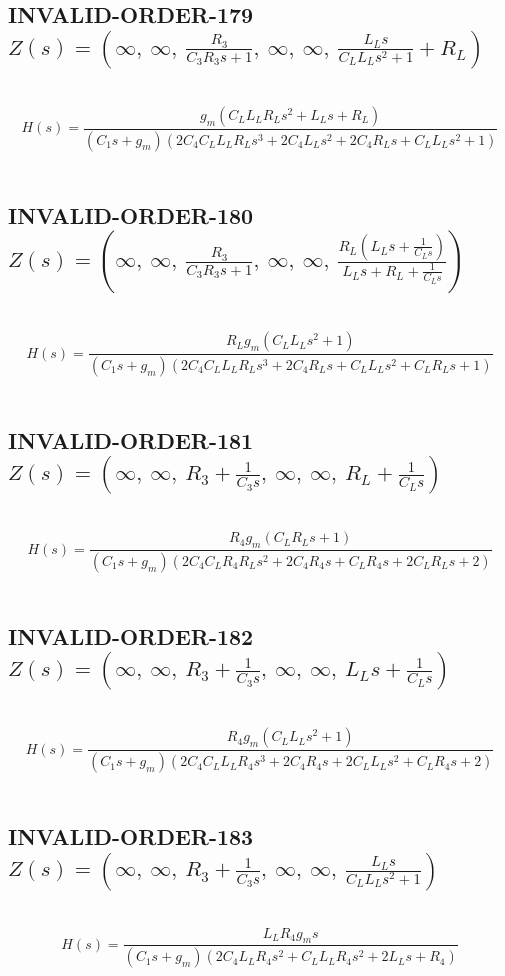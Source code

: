 \documentclass{article}
\begin{document}
\subsection{INVALID-ORDER-179 $Z(s) = \left( \infty, \  \infty, \  \frac{R_{3}}{C_{3} R_{3} s + 1}, \  \infty, \  \infty, \  \frac{L_{L} s}{C_{L} L_{L} s^{2} + 1} + R_{L}\right)$ } \ 
\textbf{\[H(s) = \frac{g_{m} \left(C_{L} L_{L} R_{L} s^{2} + L_{L} s + R_{L}\right)}{\left(C_{1} s + g_{m}\right) \left(2 C_{4} C_{L} L_{L} R_{L} s^{3} + 2 C_{4} L_{L} s^{2} + 2 C_{4} R_{L} s + C_{L} L_{L} s^{2} + 1\right)}\] } \ 
\subsection{INVALID-ORDER-180 $Z(s) = \left( \infty, \  \infty, \  \frac{R_{3}}{C_{3} R_{3} s + 1}, \  \infty, \  \infty, \  \frac{R_{L} \left(L_{L} s + \frac{1}{C_{L} s}\right)}{L_{L} s + R_{L} + \frac{1}{C_{L} s}}\right)$ } \ 
\textbf{\[H(s) = \frac{R_{L} g_{m} \left(C_{L} L_{L} s^{2} + 1\right)}{\left(C_{1} s + g_{m}\right) \left(2 C_{4} C_{L} L_{L} R_{L} s^{3} + 2 C_{4} R_{L} s + C_{L} L_{L} s^{2} + C_{L} R_{L} s + 1\right)}\] } \ 
\subsection{INVALID-ORDER-181 $Z(s) = \left( \infty, \  \infty, \  R_{3} + \frac{1}{C_{3} s}, \  \infty, \  \infty, \  R_{L} + \frac{1}{C_{L} s}\right)$ } \ 
\textbf{\[H(s) = \frac{R_{4} g_{m} \left(C_{L} R_{L} s + 1\right)}{\left(C_{1} s + g_{m}\right) \left(2 C_{4} C_{L} R_{4} R_{L} s^{2} + 2 C_{4} R_{4} s + C_{L} R_{4} s + 2 C_{L} R_{L} s + 2\right)}\] } \ 
\subsection{INVALID-ORDER-182 $Z(s) = \left( \infty, \  \infty, \  R_{3} + \frac{1}{C_{3} s}, \  \infty, \  \infty, \  L_{L} s + \frac{1}{C_{L} s}\right)$ } \ 
\textbf{\[H(s) = \frac{R_{4} g_{m} \left(C_{L} L_{L} s^{2} + 1\right)}{\left(C_{1} s + g_{m}\right) \left(2 C_{4} C_{L} L_{L} R_{4} s^{3} + 2 C_{4} R_{4} s + 2 C_{L} L_{L} s^{2} + C_{L} R_{4} s + 2\right)}\] } \ 
\subsection{INVALID-ORDER-183 $Z(s) = \left( \infty, \  \infty, \  R_{3} + \frac{1}{C_{3} s}, \  \infty, \  \infty, \  \frac{L_{L} s}{C_{L} L_{L} s^{2} + 1}\right)$ } \ 
\textbf{\[H(s) = \frac{L_{L} R_{4} g_{m} s}{\left(C_{1} s + g_{m}\right) \left(2 C_{4} L_{L} R_{4} s^{2} + C_{L} L_{L} R_{4} s^{2} + 2 L_{L} s + R_{4}\right)}\] } \ 
\end{document}
